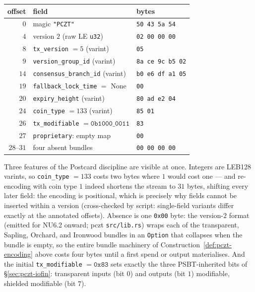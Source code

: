 \documentclass[11pt,a4paper]{article}
\theoremstyle{definition}
\begin{document}
\begin{center}
\small
\begin{tabular}{r l l}
\toprule
offset & field & bytes \\
\midrule
$0$  & magic \texttt{"PCZT"}                    & \texttt{50 43 5a 54} \\
$4$  & version $2$ (raw LE \texttt{u32})        & \texttt{02 00 00 00} \\
$8$  & \texttt{tx\_version} $= 5$ (varint)      & \texttt{05} \\
$9$  & \texttt{version\_group\_id} (varint)     & \texttt{8a ce 9c b5 02} \\
$14$ & \texttt{consensus\_branch\_id} (varint)  & \texttt{b0 e6 df a1 05} \\
$19$ & \texttt{fallback\_lock\_time} $=$ None   & \texttt{00} \\
$20$ & \texttt{expiry\_height} (varint)         & \texttt{80 ad e2 04} \\
$24$ & \texttt{coin\_type} $= 133$ (varint)     & \texttt{85 01} \\
$26$ & \texttt{tx\_modifiable} $= \mathtt{0b1000\_0011}$ & \texttt{83} \\
$27$ & \texttt{proprietary}: empty map          & \texttt{00} \\
$28$--$31$ & four absent bundles                & \texttt{00 00 00 00} \\
\bottomrule
\end{tabular}
\end{center}

Three features of the Postcard discipline are visible at once. Integers are
LEB128 varints, so \texttt{coin\_type} $= 133$ costs two bytes where $1$
would cost one --- and re-encoding with coin type $1$ indeed shortens the
stream to $31$ bytes, shifting every later field: the encoding is positional,
which is precisely why fields cannot be inserted within a version
(cross-checked by script: single-field variants differ exactly at the
annotated offsets). Absence is one \texttt{0x00} byte: the version-$2$ format
(emitted for NU6.2 onward; \textsf{pczt} \texttt{src/lib.rs}) wraps each of
the transparent, Sapling, Orchard, and Ironwood bundles in an
\texttt{Option} that collapses when the bundle is empty, so the entire
bundle machinery of Construction~\ref{def:pczt-encoding} above costs four
bytes until a first spend or output materialises. And the initial
\texttt{tx\_modifiable} $= \mathtt{0x83}$ sets exactly the three
PSBT-inherited bits of \S\ref{sec:pczt-iofin}: transparent inputs (bit $0$)
and outputs (bit $1$) modifiable, shielded modifiable (bit $7$).
\end{document}
